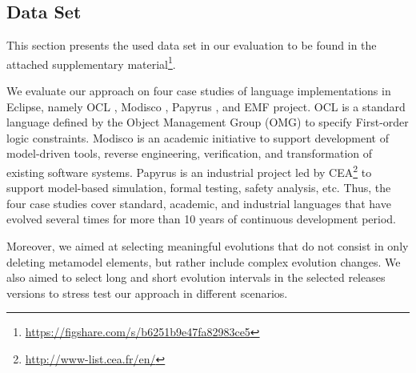 \subsection{Data Set}
This section presents the used data set in our evaluation to be found in the attached supplementary material\footnote{\url{https://figshare.com/s/b6251b9e47fa82983ce5}}. 

%

We evaluate our approach on four case studies of language implementations in Eclipse, namely OCL \cite{MDTOCL}, Modisco \cite{MDTModisco}, Papyrus \cite{MDTPapyrus}, and EMF \cite{EclipseEMF} project. 
%
OCL is a standard language defined by the Object Management Group (OMG) to specify First-order logic constraints. Modisco is an academic initiative to support development of model-driven tools, reverse engineering, verification, and transformation of existing software systems. 
Papyrus is an industrial project led by CEA\footnote{\url{http://www-list.cea.fr/en/}} to support model-based simulation, formal testing, safety analysis, etc. 
Thus, the four case studies cover standard, academic, and industrial languages that have evolved several times for more than 10 years of continuous development period. 

Moreover, we aimed at selecting meaningful evolutions that do not consist in only deleting metamodel elements, but rather include complex evolution changes. We also aimed to select long and short evolution intervals in the selected releases versions to stress test our approach in different scenarios. 

